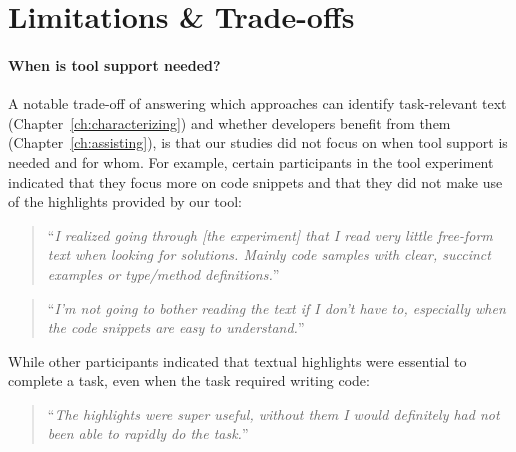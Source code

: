 



\section{Limitations \& Trade-offs}
\label{cp7:tools}






\paragraph{\textbf{When is tool support needed?}} 


A notable trade-off of answering which approaches can identify task-relevant text (Chapter~\ref{ch:characterizing}) and whether developers benefit from them (Chapter~\ref{ch:assisting}), is that our studies did not focus on when tool support is needed and for whom.
For example, certain participants in the \acs{tool} experiment indicated that they focus more on code snippets
and that they did not make use of the highlights provided by our tool:




\smallskip
\begin{footnotesize}
\begin{quote}
``\textit{I realized going through [the experiment] that I read very little free-form text when looking for solutions. Mainly code samples with clear, succinct examples or type/method definitions.}''
\end{quote}
\end{footnotesize}

\begin{footnotesize}
\begin{quote}
``\textit{I'm not going to bother reading the text if I don't have to, especially when the code snippets are easy to understand.}''
\end{quote}
\end{footnotesize}


While other participants indicated that textual highlights were essential to complete a task, even when the task required writing code:



\smallskip
\begin{footnotesize}
    \begin{quote}
        ``\textit{The highlights were super useful, without them I would definitely had not been able to rapidly do the task.}''
    \end{quote}
\end{footnotesize}


